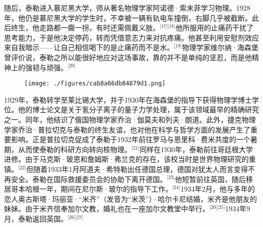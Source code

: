 随后，泰勒进入慕尼黑大学，师从著名物理学家阿诺德·索末菲学习物理。1928年，他仍是慕尼黑大学的学生时，不幸被一辆有轨电车撞倒，右脚几乎被截断。此后终生，他走路都一瘸一拐，有时还需佩戴义肢。\(^\text{[17][18]}\)他所服用的止痛药干扰了思考能力，于是他决定停药，转而凭借意志力来对抗疼痛。他甚至利用安慰剂效应来自我暗示——让自己相信喝下的是止痛药而不是水。\(^\text{[19]}\)物理学家维尔纳·海森堡曾评价说，泰勒之所以能很好地应对这场事故，靠的并不是单纯的坚忍，而是他精神上的强韧与顽强。\(^\text{[20]}\)
\begin{figure}[ht]
\centering
\texttt{[image: ./figures/cab8a66db84879d1.png]}
\caption{} \label{fig_ADHTL_3}
\end{figure}
1929年，泰勒转学至莱比锡大学，并于1930年在海森堡的指导下获得物理学博士学位。他的博士论文是关于氢分子离子的量子力学处理，属于该领域最早的精确研究之一。同年，他结识了俄国物理学家乔治·伽莫夫和列夫·朗道。此外，捷克物理学家乔治·普拉切克与泰勒的终生友谊，也对他在科学与哲学方面的发展产生了重要影响。正是普拉切克促成了泰勒于1932年前往罗马与恩里科·费米共度的一个暑期，从而使泰勒的科研方向转向核物理。\(^\text{[21]}\)同样在1930年，泰勒前往哥廷根大学进修。由于马克斯·玻恩和詹姆斯·弗兰克的存在，该校当时是世界物理研究的重镇。\(^\text{[22]}\)但随着1933年1月阿道夫·希特勒出任德国总理，德国对犹太人而言变得不再安全。泰勒在国际救援委员会的协助下离开德国。\(^\text{[23]}\)他短暂前往英国，随后移居哥本哈根一年，期间在尼尔斯·玻尔的指导下工作。\(^\text{[24]}\)1934年2月，他与多年的恋人奥古斯塔·玛丽亚·“米齐”（发音为“米茨”）·哈尔卡尼结婚，米齐是他朋友的妹妹。由于米齐信奉加尔文教，婚礼也在一座加尔文教堂中举行。\(^\text{[20][25]}\)1934年9月，泰勒返回英国。\(^\text{[26][27]}\)
